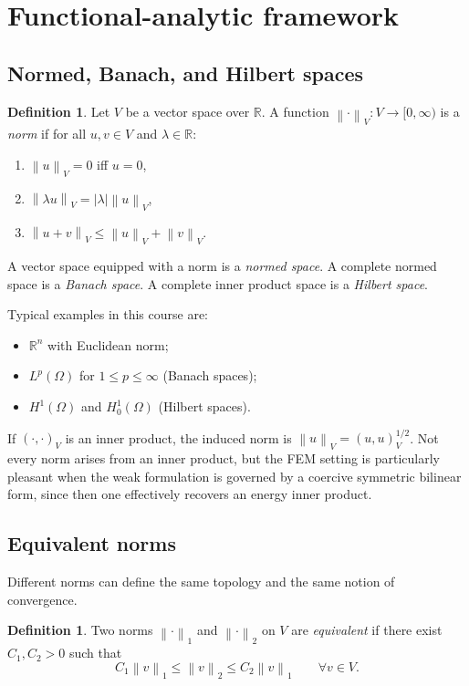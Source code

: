 \documentclass[11pt]{article}
\theoremstyle{definition}
\newtheorem{definition}[theorem]{Definition}
\newcommand{\R}{\mathbb{R}}
\newcommand{\norm}[1]{\left\lVert #1\right\rVert}
\newcommand{\abs}[1]{\left\lvert #1\right\rvert}
\begin{document}
\section{Functional-analytic framework}

\subsection{Normed, Banach, and Hilbert spaces}

\begin{definition}
Let $V$ be a vector space over $\R$. A function $\norm{\cdot}_V:V\to[0,\infty)$ is a \emph{norm} if for all $u,v\in V$ and $\lambda\in\R$:
\begin{enumerate}
    \item $\norm{u}_V=0$ iff $u=0$,
    \item $\norm{\lambda u}_V = \abs{\lambda}\norm{u}_V$,
    \item $\norm{u+v}_V \le \norm{u}_V+\norm{v}_V$.
\end{enumerate}
A vector space equipped with a norm is a \emph{normed space}. A complete normed space is a \emph{Banach space}. A complete inner product space is a \emph{Hilbert space}.
\end{definition}

Typical examples in this course are:
\begin{itemize}
    \item $\R^n$ with Euclidean norm;
    \item $L^p(\Omega)$ for $1\le p\le\infty$ (Banach spaces);
    \item $H^1(\Omega)$ and $H_0^1(\Omega)$ (Hilbert spaces).
\end{itemize}

If $(\cdot,\cdot)_V$ is an inner product, the induced norm is $\norm{u}_V = (u,u)_V^{1/2}$. Not every norm arises from an inner product, but the FEM setting is particularly pleasant when the weak formulation is governed by a coercive symmetric bilinear form, since then one effectively recovers an energy inner product.

\subsection{Equivalent norms}

Different norms can define the same topology and the same notion of convergence.

\begin{definition}
Two norms $\norm{\cdot}_1$ and $\norm{\cdot}_2$ on $V$ are \emph{equivalent} if there exist $C_1,C_2>0$ such that
\[
C_1\norm{v}_1 \le \norm{v}_2 \le C_2\norm{v}_1 \qquad \forall v\in V.
\]
\end{definition}
\end{document}
